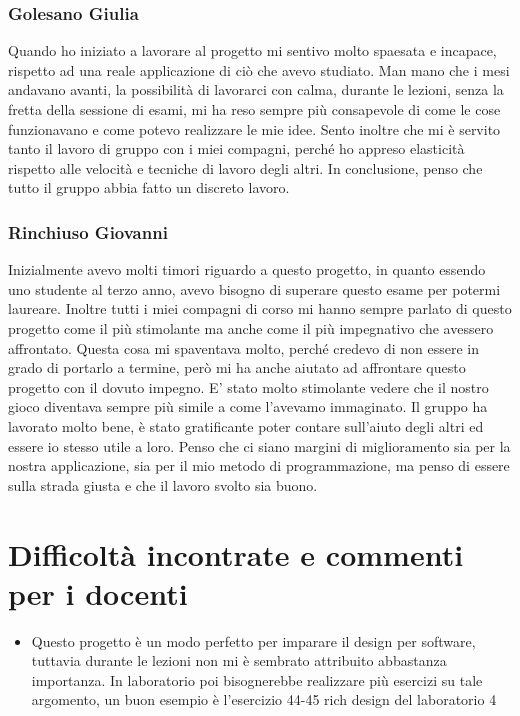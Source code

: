 \documentclass[a4paper,12pt]{report}
\begin{document}
\subsubsection{Golesano Giulia}
Quando ho iniziato a lavorare al progetto mi sentivo molto spaesata e incapace, rispetto ad una reale applicazione di ciò che avevo studiato.
Man mano che i mesi andavano avanti, la possibilità di lavorarci con calma, durante le lezioni, senza la fretta della sessione di esami, mi ha reso sempre più consapevole di come le cose funzionavano e come potevo realizzare le mie idee.
Sento inoltre che mi è servito tanto il lavoro di gruppo con i miei compagni, perché ho appreso elasticità rispetto alle velocità e tecniche di lavoro degli altri.
In conclusione, penso che tutto il gruppo abbia fatto un discreto lavoro.

\subsubsection{Rinchiuso Giovanni}
Inizialmente avevo molti timori riguardo a questo progetto, in quanto essendo uno studente al terzo anno, avevo bisogno di superare questo esame per potermi laureare. Inoltre tutti i miei compagni di corso mi hanno sempre parlato di questo progetto come il più stimolante ma anche come il più impegnativo che avessero affrontato. Questa cosa mi spaventava molto, perché credevo di non essere in grado di portarlo a termine, però mi ha anche aiutato ad affrontare questo progetto con il dovuto impegno. E' stato molto stimolante vedere che il nostro gioco diventava sempre più simile a come l'avevamo immaginato. Il gruppo ha lavorato molto bene, è stato gratificante poter contare sull'aiuto degli altri ed essere io stesso utile a loro. Penso che ci siano margini di miglioramento sia per la nostra applicazione, sia per il mio metodo di programmazione, ma penso di essere sulla strada giusta e che il lavoro svolto sia buono. 

\section{Difficoltà incontrate e commenti per i docenti}
\begin{itemize}
    \item Questo progetto è un modo perfetto per imparare il design per software, tuttavia durante le lezioni non mi è sembrato attribuito abbastanza importanza. In laboratorio poi bisognerebbe realizzare più esercizi su tale argomento, un buon esempio è l'esercizio 44-45 rich design del laboratorio 4
\end{itemize}
\end{document}
